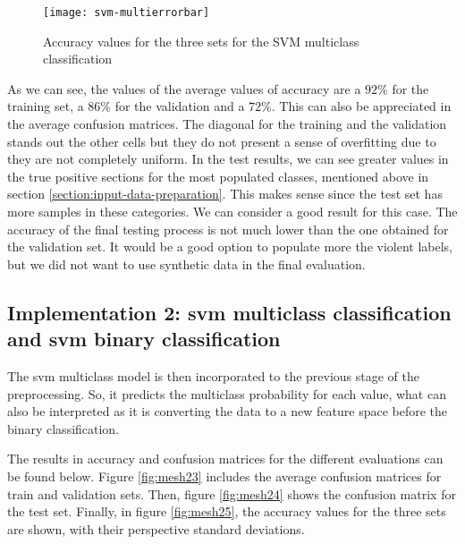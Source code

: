 	\begin{figure}[H]
		\centering
		\captionsetup{justification=centering}
		\texttt{[image: svm-multierrorbar]}
		\caption{Accuracy values for the three sets for the SVM multiclass classification}
		\label{fig:mesh20}
	\end{figure}

	As we can see, the values of the average values of accuracy are a $92\%$ for the training set, a $86\%$ for the validation and a $72\%$. This can also be appreciated in the average confusion matrices. The diagonal for the training and the validation stands out the other cells but they do not present a sense of overfitting due to they are not completely uniform. In the test results, we can see greater values in the true positive sections for the most populated classes, mentioned above in section \ref{section:input-data-preparation}. This makes sense since the test set has more samples in these categories. We can consider a good result for this case. The accuracy of the final testing process is not much lower than the one obtained for the validation set. It would be a good option to populate more the violent labels, but we did not want to use synthetic data in the final evaluation.

\subsection{Implementation 2: \acrshort{svm} multiclass classification and \acrshort{svm} binary classification}

	The \acrshort{svm} multiclass model is then incorporated to the previous stage of the preprocessing. So, it predicts the multiclass probability for each value, what can also be interpreted as it is converting the data to a new feature space before the binary classification.
	
	The results in accuracy and confusion matrices for the different evaluations can be found below. Figure \ref{fig:mesh23} includes the average confusion matrices for train and validation sets. Then, figure \ref{fig:mesh24} shows the confusion matrix for the test set. Finally, in figure \ref{fig:mesh25}, the accuracy values for the three sets are shown, with their perspective standard deviations.
	

